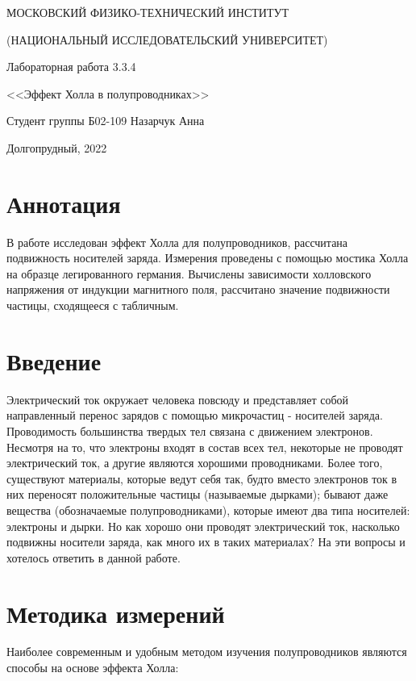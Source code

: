 \documentclass[a4paper,12pt]{article} %
\begin{document}
\begin{titlepage}

\thispagestyle{empty}

\centerline{МОСКОВСКИЙ ФИЗИКО-ТЕХНИЧЕСКИЙ ИНСТИТУТ}
\centerline{(НАЦИОНАЛЬНЫЙ ИССЛЕДОВАТЕЛЬСКИЙ УНИВЕРСИТЕТ)}

\vfill

\centerline{\huge{Лабораторная работа 3.3.4}}
\centerline{\LARGE{<<Эффект Холла в полупроводниках>>}}

\vfill

Студент группы Б02-109 \hfill Назарчук Анна

\vfill

\centerline{Долгопрудный, 2022}
\clearpage
\end{titlepage} 

\section{Аннотация}
В работе исследован эффект Холла для полупроводников, рассчитана подвижность носителей заряда. Измерения проведены с помощью мостика Холла на образце легированного германия. Вычислены зависимости холловского напряжения от индукции магнитного поля, рассчитано значение подвижности частицы, сходящееся с табличным. 

\section{Введение}
Электрический ток окружает человека повсюду и представляет собой направленный перенос зарядов с помощью микрочастиц - носителей заряда. Проводимость большинства твердых тел связана с движением электронов. Несмотря на то, что электроны входят в состав всех тел, некоторые не проводят электрический ток, а другие являются хорошими проводниками. Более того, существуют материалы, которые ведут себя так, будто вместо электронов ток в них переносят положительные частицы (называемые дырками); бывают даже вещества (обозначаемые полупроводниками), которые имеют два типа носителей: электроны и дырки. Но как хорошо они проводят электрический ток, насколько подвижны носители заряда, как много их в таких материалах? На эти вопросы и хотелось ответить в данной работе.


\section{Методика измерений}
Наиболее современным и удобным методом изучения полупроводников являются способы на основе эффекта Холла:
\end{document}
